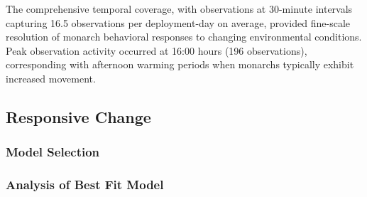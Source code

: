 The comprehensive temporal coverage, with observations at 30-minute intervals capturing 16.5 observations per deployment-day on average, provided fine-scale resolution of monarch behavioral responses to changing environmental conditions. Peak observation activity occurred at 16:00 hours (196 observations), corresponding with afternoon warming periods when monarchs typically exhibit increased movement.

\subsection{Responsive Change}


\subsubsection{Model Selection}


\subsubsection{Analysis of Best Fit Model}



